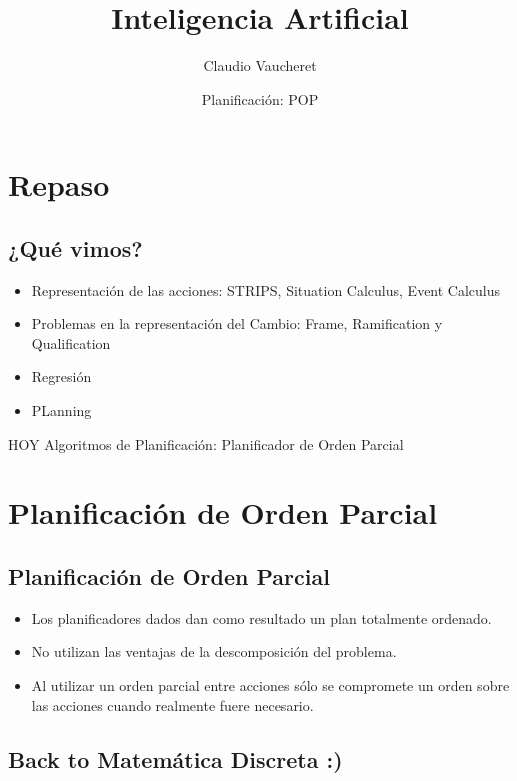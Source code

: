 \documentclass[11pt]{article}
\author{Claudio Vaucheret}
\date{Planificación: POP}
\title{Inteligencia Artificial}
\begin{document}
\maketitle
\setcounter{tocdepth}{1}
\tableofcontents


\section*{Repaso}
\label{sec:org8b1ed71}

\subsection*{¿Qué vimos?}
\label{sec:orgee194eb}
\begin{itemize}
\item Representación de las acciones: STRIPS, Situation Calculus, Event Calculus
\item Problemas en la representación del Cambio: Frame, Ramification y Qualification
\item Regresión
\item PLanning
\end{itemize}


{\color{red}HOY}
{\color{red}Algoritmos de Planificación: Planificador de Orden Parcial}

\section*{Planificación de Orden Parcial}
\label{sec:orga9854a9}

\subsection*{Planificación de Orden Parcial}
\label{sec:org2fc595e}
\begin{itemize}
\item Los planificadores dados dan como resultado un plan  totalmente ordenado.
\item No utilizan las ventajas de la descomposición del problema.
\item Al utilizar un orden parcial entre acciones sólo se compromete un
orden sobre las acciones cuando realmente fuere necesario.
\end{itemize}

\subsection*{Back to Matemática Discreta :)}
\label{sec:org1661dbd}
\end{document}
